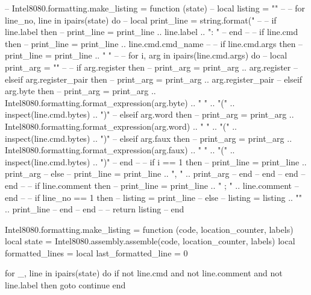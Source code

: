-- Intel8080.formatting.make_listing = function (state)
--     local listing = ""
-- 
--     for line_no, line in ipairs(state) do
--         local print_line = string.format("%
-- 
--         if line.label then
--             print_line = print_line .. line.label .. ": "
--         end
-- 
--         if line.cmd then
--             print_line = print_line .. line.cmd.cmd_name
-- 
--             if line.cmd.args then
--                 print_line = print_line .. " "
-- 
--                 for i, arg in ipairs(line.cmd.args) do
--                     local print_arg = ""
-- 
--                     if arg.register then
--                         print_arg = print_arg .. arg.register
--                     elseif arg.register_pair then
--                         print_arg = print_arg .. arg.register_pair
--                     elseif arg.byte then
--                         print_arg = print_arg .. Intel8080.formatting.format_expression(arg.byte) .. " " .. "(" .. inspect(line.cmd.bytes) .. ")"
--                     elseif arg.word then
--                         print_arg = print_arg .. Intel8080.formatting.format_expression(arg.word) .. " " .. "(" .. inspect(line.cmd.bytes) .. ")"
--                     elseif arg.faux then
--                         print_arg = print_arg .. Intel8080.formatting.format_expression(arg.faux) .. " " .. "(" .. inspect(line.cmd.bytes) .. ")"
--                     end
-- 
--                     if i == 1 then
--                         print_line = print_line .. print_arg
--                     else
--                         print_line = print_line .. ", " .. print_arg
--                     end
--                 end
--             end
--         end
-- 
--         if line.comment then
--             print_line = print_line .. " ; " .. line.comment
--         end
-- 
--         if line_no == 1 then
--             listing = print_line
--         else
--             listing = listing ..  "\n" .. print_line
--         end
--     end
-- 
--     return listing
-- end

Intel8080.formatting.make_listing = function (code, location_counter, labels)
    local state = Intel8080.assembly.assemble(code, location_counter, labels)
    local formatted_lines = {}
    local last_formatted_line = 0

    for _, line in ipairs(state) do
        if not line.cmd and not line.comment and not line.label then
            goto continue
        end

